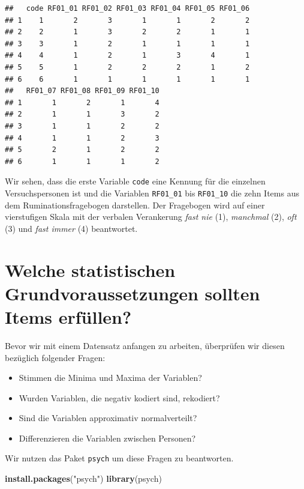 \documentclass[
  ngerman,
]{book}
\newenvironment{Shaded}{\begin{snugshade}}{\end{snugshade}}
\newcommand{\FunctionTok}[1]{\textcolor[rgb]{0.13,0.29,0.53}{\textbf{#1}}}
\newcommand{\NormalTok}[1]{#1}
\newcommand{\StringTok}[1]{\textcolor[rgb]{0.31,0.60,0.02}{#1}}
\providecommand{\tightlist}{%
  \setlength{\itemsep}{0pt}\setlength{\parskip}{0pt}}
\begin{document}
\begin{verbatim}
##   code RF01_01 RF01_02 RF01_03 RF01_04 RF01_05 RF01_06
## 1    1       2       3       1       1       2       2
## 2    2       1       3       2       2       1       1
## 3    3       1       2       1       1       1       1
## 4    4       1       2       1       3       4       1
## 5    5       1       2       2       2       1       2
## 6    6       1       1       1       1       1       1
##   RF01_07 RF01_08 RF01_09 RF01_10
## 1       1       2       1       4
## 2       1       1       3       2
## 3       1       1       2       2
## 4       1       1       2       3
## 5       2       1       2       2
## 6       1       1       1       2
\end{verbatim}

Wir sehen, dass die erste Variable \texttt{code} eine Kennung für die einzelnen Versuchspersonen ist und die Variablen \texttt{RF01\_01} bis \texttt{RF01\_10} die zehn Items aus dem Ruminationsfragebogen darstellen. Der Fragebogen wird auf einer vierstufigen Skala mit der verbalen Verankerung \emph{fast nie} (1), \emph{manchmal} (2), \emph{oft} (3) und \emph{fast immer} (4) beantwortet.

\section{Welche statistischen Grundvoraussetzungen sollten Items erfüllen?}\label{welche-statistischen-grundvoraussetzungen-sollten-items-erfuxfcllen}

Bevor wir mit einem Datensatz anfangen zu arbeiten, überprüfen wir diesen bezüglich folgender Fragen:

\begin{itemize}
\tightlist
\item
  Stimmen die Minima und Maxima der Variablen?
\item
  Wurden Variablen, die negativ kodiert sind, rekodiert?
\item
  Sind die Variablen approximativ normalverteilt?
\item
  Differenzieren die Variablen zwischen Personen?
\end{itemize}

Wir nutzen das Paket \texttt{psych} um diese Fragen zu beantworten.

\begin{Shaded}
\begin{Highlighting}[]
\FunctionTok{install.packages}\NormalTok{(}\StringTok{"psych"}\NormalTok{)}
\FunctionTok{library}\NormalTok{(psych)}
\end{Highlighting}
\end{Shaded}
\end{document}
